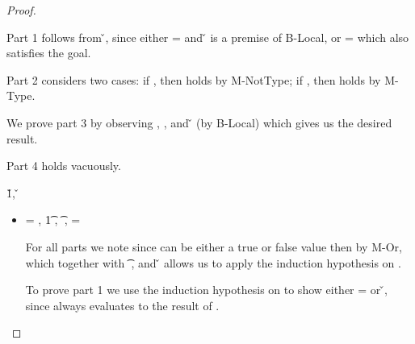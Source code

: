 \begin{lemma}
\begin{proof}
\begin{case}[B-Local]
\begin{itemize}
\begin{subcase}[T-Local]
Part 1 follows from \inopenv{\openv{}}{\object{}} {\v{}}, since either {\object{}} = \x{}
and \inopenv{\openv{}}{\x{}} {\v{}} is a premise of B-Local, or {\object{}} = {\emptyobject{}} which also
satisfies the goal.

Part 2 considers two cases: if \istrueval{\v{}}, then 
\satisfies{\openv{}}{\notprop{\falsy}{\x{}}} holds by M-NotType; if \isfalseval{\v{}}, then 
\satisfies{\openv{}}{\isprop{\falsy}{\x{}}} holds by M-Type.

We prove part 3 by observing
\inpropenv{\propenv{}}{\isprop{\t{}}{\x{}}},
\satisfies{\openv{}}{\propenv{}},
and
\inopenv {\openv{}} {\x{}} {\v{}}
(by B-Local)
which gives us the desired result.

Part 4 holds vacuously.
\end{subcase}
\end{itemize}

\end{case}

\begin{case}[B-Do]
  \opsem {\openv{}} {} {\v{1}},
  \opsem {\openv{}} {} {\v{}}

\begin{itemize}
  \item[] \begin{subcase}[T-Do]
\ep{} = { {}},
  \judgementrewrite {\propenv{}} 
             {} {\t1}
             { {}} 
             {}
             {},
           {\ep{}} {\t{}}
           {\filterset {\thenprop {\prop{}}} {\elseprop {\prop{}}}} 
           {\object{}}
           {\e{}},
\e{} = { {}}

For all parts we note 
    since {} can be either a true or false value
    then
    {}
    by M-Or,
    which together with 
           {} {\t{}}
           {\filterset {\thenprop {\prop{}}} {\elseprop {\prop{}}}} 
           {\object{}},
    and
  \opsem {\openv{}} {} {\v{}}
    allows us to apply the induction hypothesis on .

To prove part 1 we use the induction hypothesis on 
to show either \object{} = \emptyobject{} 
or \inopenv {\openv{}} {\object{}} {\v{}}, since \e{} always
evaluates to the result of .


\end{subcase}
\end{itemize}
\end{case}
\end{proof}
\end{lemma}
